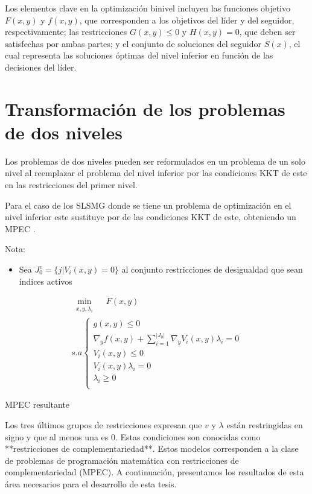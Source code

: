 Los elementos clave en la optimización binivel incluyen las funciones objetivo $F(x, y)$ y $f(x, y)$, que corresponden a los objetivos del líder y del seguidor, respectivamente; las restricciones $G(x, y) \leq 0$ y $H(x, y) = 0$, que deben ser satisfechas por ambas partes; y el conjunto de soluciones del seguidor $S(x)$, el cual representa las soluciones óptimas del nivel inferior en función de las decisiones del líder.

\section{Transformación de los problemas de dos niveles}
		
		Los problemas de dos niveles pueden ser reformulados en un problema de un solo nivel al reemplazar el problema del nivel inferior por las condiciones KKT de este en las restricciones del primer nivel. 
		
		Para el caso de los SLSMG donde se tiene un problema de optimización en el nivel inferior este sustituye por de las condiciones KKT de este, obteniendo un MPEC \autocite{aussel2020}.
		
        \begin{table}
				Nota:
        	\begin{itemize}
        	    \item Sea $ J_0^v=\{j | V_i(x,y)=0\}$ al conjunto restricciones de desigualdad que sean índices activos
			
        	\end{itemize}
		\end{table}
        
		\begin{table}[H]

		\[\begin{array}{l}
			\underset{\substack{x, y, \lambda_i}}{\min} \quad F(x, y)\\
			s.a \left\{ \begin{array}{l}
				
				g(x, y) \leq 0\\
				\nabla_{y} f(x, y) + \sum_{i=1}^{|J_{0}|} \nabla_{y} V_i(x, y) \lambda_i = 0 \\
				V_i(x, y) \leq 0 \\
				V_i(x, y)\lambda_i = 0 \\
				\lambda_i \geq 0\\
			\end{array}\right.
		\end{array}\]
		\caption*{MPEC resultante}
		\end{table}
Los tres últimos grupos de restricciones expresan que \( v \) y \( \lambda \) están restringidas en signo y que al menos una es 0. Estas condiciones son conocidas como **restricciones de complementariedad**. Estos modelos corresponden a la clase de problemas de programación matemática con restricciones de complementariedad (MPEC). A continuación, presentamos los resultados de esta área necesarios para el desarrollo de esta tesis.


